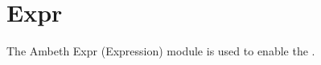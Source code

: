 \section{Expr}
\label{module:Expr}
\ClearAPI
The Ambeth Expr (Expression) module is used to enable the  .
